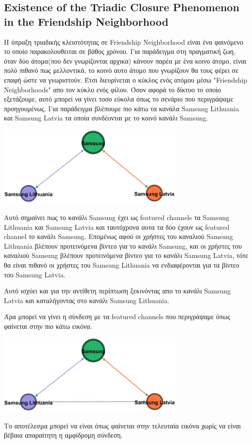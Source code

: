 \documentclass[12pt]{article}
\begin{document}
	\newpage
	\subsection{Existence of the Triadic Closure Phenomenon in the Friendship Neighborhood}
	Η ύπραξη τριαδικής κλειστότητας σε Friendship Neighborhood είναι ένα φαινόμενο το οποίο παρακολουθειται σε βάθος χρόνου. Για παράδειγμα στη πραγματική ζωη, όταν δύο άτομα(που δεν γνωρίζονται αρχικα) κάνουν παρέα με ένα κοινο άτομο, είναι πολύ πιθανό πως μελλοντικά, το κοινό αυτο άτομο που γνωρίζουν θα τους φέρει σε επαφή ώστε να γνωριστούν. Έτσι διευρίνεται ο κύκλος ενός ατόμου μέσω "Friendship Neighborhoods" απο τον κύκλο ενός φίλου. Όσον αφορά το δίκτυο το οποίο εξετάζουμε, αυτό μπορεί να γίνει τοσο εύκολα όπως το σενάριο που περιγράψαμε προηγουμένως. Για παράδειγμα βλέπουμε πιο κάτω τα κανάλα Samsung Lithuania και Samsung Latvia τα οποία συνδέονται με το κοινό κανάλι Samsung.
	\begin{center}
		\includegraphics[width=0.7\textwidth]{photos-files/section8/8.4_with_2_edges.JPG}
	\end{center}
	Αυτό σημαίνει πως το κανάλι Samsung έχει ως featured channels τα Samsung Lithuania και Samsung Latvia και ταυτόχρονα αυτα τα δύο έχουν ως featured channel το κανάλι Samsung. Επομένως αφού οι χρήστες του καναλιού Samsung Lithuania βλέπουν προτεινόμενα βίντεο για το κανάλι Samsung, και οι χρήστες του καναλιού Samsung βλέπουν προτεινόμενα βίντεο για το κανάλι Samsung Latvia, τότε θα είναι πιθανό οι χρήστες του Samsung Lithuania να ενδιαφέρονται για τα βίντεο του Samsung Latvia.
	\par
	Αυτό ισχύει και για την αντίθετη περίπτωση ξεκινόντας απο το κανάλι Samsung Latvia και καταλήγοντας στο κανάλι Samsung Lithuania.
	
	\newpage
	Άρα μπορεί να γίνει η σύνδεση με τα featured channels που περιγράψαμε όπως φαίνεται στην πιο κάτω εικόνα.
	\begin{center}
		\includegraphics[width=0.7\textwidth]{photos-files/section8/8.4_with_3_edges.JPG}
	\end{center}
	Το αποτέλεσμα μπορεί να είναι όπως φαίνεται στην τελευταία εικόνα χωρίς να είναι βέβαια απαραίτητη η αμφίδρομη σύνδεση.
	\label{chap:clustering_effects_8}
	
\end{document}
